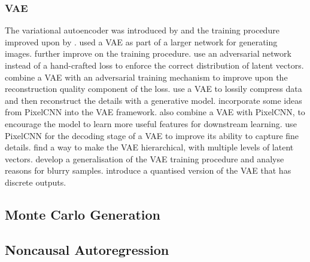 \documentclass[10pt,a4paper]{article}
\begin{document}
\subsubsection{VAE}

The variational autoencoder was introduced by \citet{vae} and the training procedure improved upon by \citet{vae2}. \citet{drawvae} used a VAE as part of a larger network for generating images. \citet{vaeflows} further improve on the training procedure. \citet{adversarialvae} use an adversarial network instead of a hand-crafted loss to enforce the correct distribution of latent vectors. \citet{vaegan} combine a VAE with an adversarial training mechanism to improve upon the reconstruction quality component of the loss. \citet{vaecompression} use a VAE to lossily compress data and then reconstruct the details with a generative model. \citet{vaeiaf} incorporate some ideas from PixelCNN into the VAE framework. \citet{vaelossy} also combine a VAE with PixelCNN, to encourage the model to learn more useful features for downstream learning. \citet{pixelvae} use PixelCNN for the decoding stage of a VAE to improve its ability to capture fine details. \citet{vaehieararchy} find a way to make the VAE hierarchical, with multiple levels of latent vectors. \citet{vaeunderstanding} develop a generalisation of the VAE training procedure and analyse reasons for blurry samples. \citet{vqvae} introduce a quantised version of the VAE that has discrete outputs.

\subsection{Monte Carlo Generation}

\citet{brnndenoise}

\subsection{Noncausal Autoregression}
\end{document}

